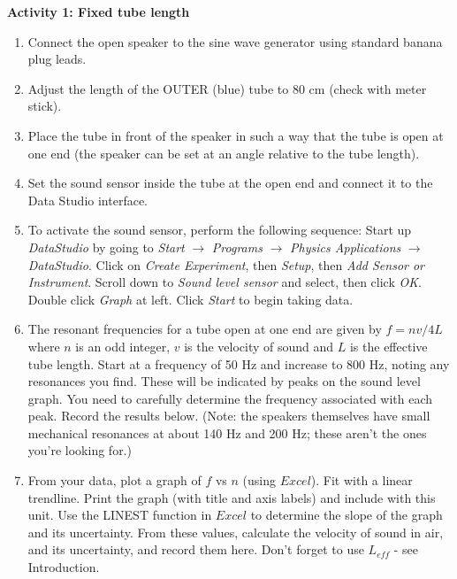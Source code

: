 {\noindent \bf Activity 1: Fixed tube length} \begin{enumerate}

\item Connect the open speaker to the sine wave generator using standard banana plug leads.

\item Adjust the length of the OUTER (blue) tube to 80 cm (check with meter stick).

\item Place the tube in front of the speaker in such a way that the tube is open at one end (the speaker can be set at an angle relative to the tube length).

\item Set the sound sensor inside the tube at the open end and connect it to the Data Studio interface.

\item To activate the sound sensor, perform the following sequence:  Start up \textit{DataStudio} by going to \textit{Start} $\rightarrow$ \textit{Programs} $\rightarrow$ \textit{Physics Applications} $\rightarrow$ \textit{DataStudio}.
Click on \textit{Create Experiment}, then \textit{Setup}, then \textit{Add Sensor or Instrument}. Scroll down to \textit{Sound level sensor} and select, then click \textit{OK}. Double click \textit{Graph} at left. Click \textit{Start} to begin taking data.

\item The resonant frequencies for a tube open at one end are given by $f=nv/4L$ where $n$ is an odd integer, $v$ is the velocity of sound and $L$ is the effective tube length. Start at a frequency of 50 Hz and increase to 800 Hz, noting any resonances you find.   These will be indicated by peaks on the sound level graph. You need to carefully determine the frequency associated with each peak.  Record the results below. (Note: the speakers themselves have small mechanical resonances at about 140 Hz and 200 Hz; these aren't the ones you're looking for.)
\vspace{10mm}

\item From your data, plot a graph of $f$ vs $n$ (using $Excel$). Fit with a linear trendline. Print the graph (with title and axis labels) and include with this unit. Use the LINEST function in $Excel$ to determine the slope of the graph and its uncertainty. From these values, calculate the velocity of sound in air, and its uncertainty, and record them here. Don't forget to use $L_{eff}$ - see Introduction.
\vspace{12mm}

\end{enumerate}

